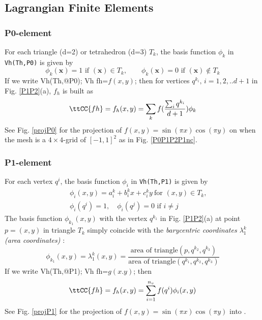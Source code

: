 \documentclass[a4paper,twoside,12pt]{book}
\begin{document}
\subsection{Lagrangian Finite Elements}
\label{sec:P0P1P2}
\subsubsection{P0-element}
For each triangle (d=2)  or tetrahedron (d=3)  $T_k$, the basis function $\phi_k$ in \texttt{Vh(Th,P0)}
is given by
$$
\phi_k(\bm{x})=1\textrm{ if }(\bm{x})\in T_k,\qquad
\phi_k(\bm{x})=0\textrm{ if }(\bm{x})\not\in T_k
$$
If we write
\bFF
Vh(Th,@P0);  Vh fh=$f(x,y)$;
\eFF
then for vertices $q^{k_i},\, i=1,2,.. d+1 $ in Fig. \ref{P1P2}(a), $f_h$ is built as
$$
\ttCC{fh}=f_h(x,y)=\sum_k f(\frac{\sum_i q^{k_i}}{d+1}) \phi_k
$$
See Fig. \ref{projP0} for the projection of $f(x,y)=\sin(\pi x)\cos(\pi y)$
on  when
the mesh  is a $4\times 4$-grid of $[-1,1]^2$ as in Fig. \ref{P0P1P2P1nc}.

\subsubsection{P1-element}

For each vertex $q^i$, the basis function $\phi_i$ in \texttt{Vh(Th,P1)}
is given by
\begin{eqnarray*}
&&\phi_i(x,y)=a^k_i+b^k_ix+c^k_iy~\textrm{for }(x,y)\in T_k,\\
&&\phi_i(q^i)=1,\quad \phi_i(q^j)=0\textrm{ if }i\neq j
\end{eqnarray*}
The basis function $\phi_{k_1}(x,y)$ with the vertex $q^{k_1}$ in
Fig. \ref{P1P2}(a) at point $p=(x,y)$ in triangle $T_k$ simply coincide with the
\emph{barycentric coordinates $\lambda^k_1$ (area coordinates)} :
$$
\phi_{k_1}(x,y) = \lambda^k_{1}(x,y)=
\frac{\textrm{area of triangle} (p, q^{k_2},q^{k_3})}
{\textrm{area of triangle}(q^{k_1},q^{k_2},q^{k_3})}
$$
If we write
\bFF
Vh(Th,@P1); Vh fh=$g(x.y)$;
\eFF
then
$$
\ttCC{fh}=f_h(x,y)=\sum_{i=1}^{n_v}f(q^i)\phi_i(x,y)
$$
See Fig. \ref{projP1} for the projection of $f(x,y)=\sin(\pi x)\cos(\pi y)$
into .

\end{document}

